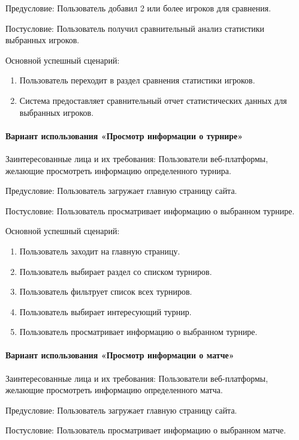 Предусловие: Пользователь добавил 2 или более игроков для сравнения.

Постусловие: Пользователь получил сравнительный анализ статистики выбранных игроков.

Основной успешный сценарий:
\begin{enumerate}
	\item Пользователь переходит в раздел сравнения статистики игроков.
	\item Система предоставляет сравнительный отчет статистических данных для выбранных игроков.
\end{enumerate}

\paragraph{Вариант использования «Просмотр информации о турнире»}

Заинтересованные лица и их требования: Пользователи веб-платформы, желающие просмотреть информацию определенного турнира.

Предусловие: Пользователь загружает главную страницу сайта.

Постусловие: Пользователь просматривает информацию о выбранном турнире.

Основной успешный сценарий:
\begin{enumerate}
	\item Пользователь заходит на главную страницу.
	\item Пользователь выбирает раздел со списком турниров.
	\item Пользователь фильтрует список всех турниров.
	\item Пользователь выбирает интересующий турнир.
	\item Пользователь просматривает информацию о выбранном турнире.
\end{enumerate}

\paragraph{Вариант использования «Просмотр информации о матче»}

Заинтересованные лица и их требования: Пользователи веб-платформы, желающие просмотреть информацию определенного матча.

Предусловие: Пользователь загружает главную страницу сайта.

Постусловие: Пользователь просматривает информацию о выбранном матче.

